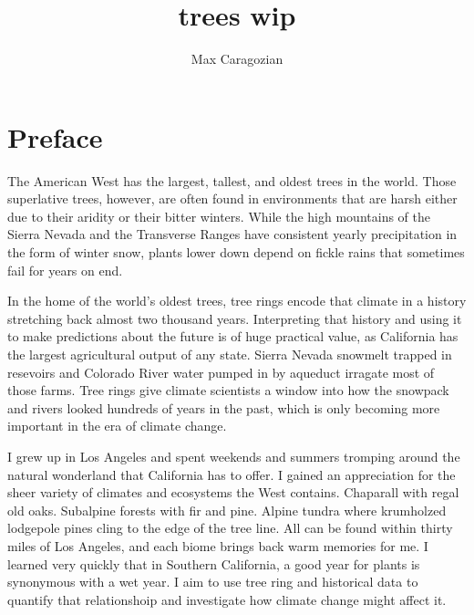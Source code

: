 \documentclass[]{article}
\title{trees wip}
\author{Max Caragozian}
\begin{document}
	


\maketitle

\section{Preface}
The  American West has the largest, tallest, and oldest trees in the world. Those superlative trees, however, are often found in environments that are harsh either due to their aridity or their bitter winters. While the high mountains of the Sierra Nevada and the Transverse Ranges have consistent yearly precipitation in the form of winter snow, plants lower down depend on fickle rains that sometimes fail for years on end.

In the home of the world's oldest trees, tree rings encode that climate in a history stretching back almost two thousand years. Interpreting that history and using it to make predictions about the future is of huge practical value, as California has the largest agricultural output of any state. Sierra Nevada snowmelt trapped in resevoirs and Colorado River water pumped in by aqueduct irragate most of those farms. Tree rings give climate scientists a window into how the snowpack and rivers looked hundreds of years in the past, which is only becoming more important in the era of climate change.

I grew up in Los Angeles and spent weekends and summers tromping around the natural wonderland that California has to offer. I gained an appreciation for the sheer variety of climates and ecosystems the West contains. Chaparall with regal old oaks. Subalpine forests with fir and pine. Alpine tundra where krumholzed lodgepole pines cling to the edge of the tree line. All can be found within thirty miles of Los Angeles, and each biome brings back warm memories for me. I learned very quickly that in Southern California, a good year for plants is synonymous with a wet year. I aim to use tree ring and historical data to quantify that relationshoip and investigate how climate change might affect it. 
\end{document}
